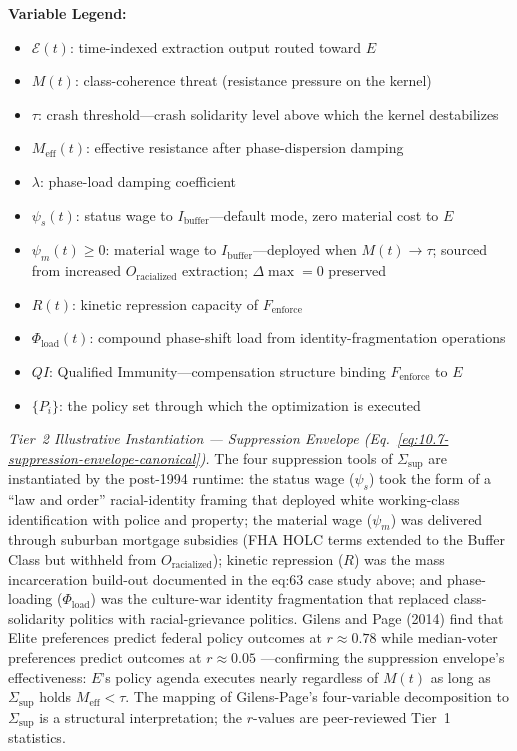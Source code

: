 \begin{definition}
\textbf{Variable Legend:}
\begin{itemize}[leftmargin=*, nosep]
    \item $\mathcal{E}(t)$: time-indexed extraction output routed toward $E$
    \item $M(t)$: class-coherence threat (resistance pressure on the kernel)
    \item $\tau$: crash threshold---crash solidarity level above which the kernel destabilizes
    \item $M_{\text{eff}}(t)$: effective resistance after phase-dispersion damping
    \item $\lambda$: phase-load damping coefficient
    \item $\psi_s(t)$: status wage to $I_{\text{buffer}}$---default mode, zero material cost to $E$
    \item $\psi_m(t) \geq 0$: material wage to $I_{\text{buffer}}$---deployed when $M(t) \to \tau$; sourced from increased $O_{\text{racialized}}$ extraction; $\Delta\max = 0$ preserved
    \item $R(t)$: kinetic repression capacity of $F_{\text{enforce}}$
    \item $\Phi_{\text{load}}(t)$: compound phase-shift load from identity-fragmentation operations
    \item $QI$: Qualified Immunity---compensation structure binding $F_{\text{enforce}}$ to $E$
    \item $\{P_i\}$: the policy set through which the optimization is executed
\end{itemize}
\end{definition}

\noindent\textit{Tier~2 Illustrative Instantiation --- Suppression Envelope (Eq.~\ref{eq:10.7-suppression-envelope-canonical}).} The four suppression tools of $\Sigma_{\text{sup}}$ are instantiated by the post-1994 runtime: the status wage ($\psi_s$) took the form of a ``law and order'' racial-identity framing that deployed white working-class identification with police and property; the material wage ($\psi_m$) was delivered through suburban mortgage subsidies (FHA HOLC terms extended to the Buffer Class but withheld from $O_{\text{racialized}}$); kinetic repression ($R$) was the mass incarceration build-out documented in the eq:63 case study above; and phase-loading ($\Phi_{\text{load}}$) was the culture-war identity fragmentation that replaced class-solidarity politics with racial-grievance politics. Gilens and Page (2014) find that Elite preferences predict federal policy outcomes at $r \approx 0.78$ while median-voter preferences predict outcomes at $r \approx 0.05$ \cite{gilens}---confirming the suppression envelope's effectiveness: $E$'s policy agenda executes nearly regardless of $M(t)$ as long as $\Sigma_{\text{sup}}$ holds $M_{\text{eff}} < \tau$. The mapping of Gilens-Page's four-variable decomposition to $\Sigma_{\text{sup}}$ is a structural interpretation; the $r$-values are peer-reviewed Tier~1 statistics.

